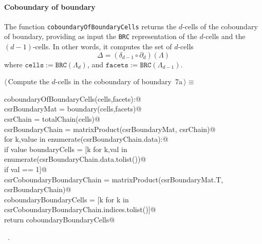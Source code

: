\documentclass[11pt,oneside]{article}	%
\begin{document}
\paragraph{Coboundary of boundary}

The function \texttt{coboundaryOfBoundaryCells} returns the $d$-cells of the coboundary of boundary, providing as input the \texttt{BRC} representation of the $d$-cells and the $(d-1)$-cells. In other words, it computes the set of $d$-cells
\[
\Delta = (\delta_{d-1}\circ\partial_d)(\Lambda)
\]
where $\texttt{cells} := \texttt{BRC}(\Lambda_d)$, and $\texttt{facets} := \texttt{BRC}(\Lambda_{d-1})$.

\begin{flushleft} \small \label{scrap12}
\protect{}$\langle\,$Compute the $d$-cells in the coboundary of boundary\nobreak\ {\footnotesize 7a}$\,\rangle\equiv$
\vspace{-1ex}
\begin{list}{}{} \item
\mbox{}\verb@def coboundaryOfBoundaryCells(cells,facets):@\\
\mbox{}\verb@    csrBoundaryMat = boundary(cells,facets)@\\
\mbox{}\verb@    csrChain = totalChain(cells)@\\
\mbox{}\verb@    csrBoundaryChain = matrixProduct(csrBoundaryMat, csrChain)@\\
\mbox{}\verb@    for k,value in enumerate(csrBoundaryChain.data):@\\
\mbox{}\verb@        if value % 2 == 0: csrBoundaryChain.data[k] = 0@\\
\mbox{}\verb@    boundaryCells = [k for k,val in enumerate(csrBoundaryChain.data.tolist())@\\
\mbox{}\verb@                               if val == 1]@\\
\mbox{}\verb@    csrCoboundaryBoundaryChain = matrixProduct(csrBoundaryMat.T, csrBoundaryChain)@\\
\mbox{}\verb@    coboundaryBoundaryCells = [k for k in csrCoboundaryBoundaryChain.indices.tolist()]@\\
\mbox{}\verb@    return coboundaryBoundaryCells@\\
\mbox{}\verb@@{\NWsep}
\end{list}
\vspace{-1ex}
\footnotesize\addtolength{\baselineskip}{-1ex}
\begin{list}{}{\setlength{\itemsep}{-\parsep}\setlength{\itemindent}{-\leftmargin}}
\item \NWtxtMacroRefIn\ .
\end{list}
\end{flushleft}
\end{document}
